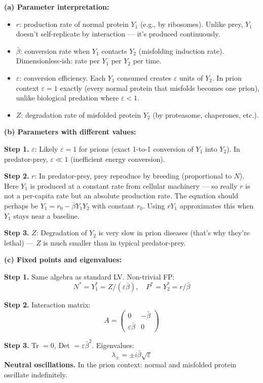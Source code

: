 \documentclass[10pt]{article}
\begin{document}
\begin{solution}
\textbf{(a) Parameter interpretation:}

\begin{itemize}
\item $r$: production rate of normal protein $Y_1$ (e.g., by ribosomes). Unlike prey, $Y_1$ doesn't self-replicate by interaction — it's produced continuously.
\item $\bar\beta$: conversion rate when $Y_1$ contacts $Y_2$ (misfolding induction rate). Dimensionless-ish: rate per $Y_1$ per $Y_2$ per time.
\item $\varepsilon$: conversion efficiency. Each $Y_1$ consumed creates $\varepsilon$ units of $Y_2$. In prion context $\varepsilon = 1$ exactly (every normal protein that misfolds becomes one prion), unlike biological predation where $\varepsilon < 1$.
\item $Z$: degradation rate of misfolded protein $Y_2$ (by proteasome, chaperones, etc.).
\end{itemize}

\medskip\textbf{(b) Parameters with different values:}

\textbf{Step 1.} $\varepsilon$: Likely $\varepsilon = 1$ for prions (exact 1-to-1 conversion of $Y_1$ into $Y_2$). In predator-prey, $\varepsilon \ll 1$ (inefficient energy conversion).

\textbf{Step 2.} $r$: In predator-prey, prey reproduce by breeding (proportional to $N$). Here $Y_1$ is produced at a constant rate from cellular machinery — so really $r$ is not a per-capita rate but an absolute production rate. The equation should perhaps be $\dot Y_1 = r_0 - \bar\beta Y_1 Y_2$ with constant $r_0$. Using $rY_1$ approximates this when $Y_1$ stays near a baseline.

\textbf{Step 3.} $Z$: Degradation of $Y_2$ is very slow in prion diseases (that's why they're lethal) — $Z$ is much smaller than in typical predator-prey.

\medskip\textbf{(c) Fixed points and eigenvalues:}

\textbf{Step 1.} Same algebra as standard LV. Non-trivial FP:
\[
N^* = Y_1^* = Z/(\varepsilon\bar\beta), \quad P^* = Y_2^* = r/\bar\beta
\]

\textbf{Step 2.} Interaction matrix:
\[
A = \begin{pmatrix} 0 & -\bar\beta \\ \varepsilon\bar\beta & 0 \end{pmatrix}
\]

\textbf{Step 3.} Tr $= 0$, Det $= \varepsilon\bar\beta^2$. Eigenvalues:
\[
\lambda_\pm = \pm i\bar\beta\sqrt\varepsilon
\]
\textbf{Neutral oscillations.} In the prion context: normal and misfolded protein oscillate indefinitely.


\end{solution}
\end{document}
